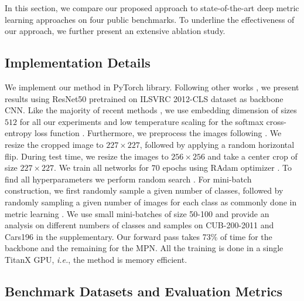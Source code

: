 \documentclass{article}
\begin{document}
In this section, we compare our proposed approach to state-of-the-art deep metric learning approaches on four public benchmarks. To underline the effectiveness of our approach, we further present an extensive ablation study.
\vspace{-0.3cm}
\subsection{Implementation Details}


We implement our method in PyTorch \cite{Paszke17} library. Following other works \cite{DBLP:conf/iccv/BrattoliRO19,DBLP:conf/cvpr/Cakir0XKS19,DBLP:conf/iccv/ManmathaWSK17,DDBLP:conf/cvpr/Sanakoyeu2019,DBLP:journals/corr/abs-2004-01113,DBLP:conf/wacv/XuanSP20,DBLP:journals/corr/abs-1811-12649}, we present results using ResNet50 \cite{7780459} pretrained on ILSVRC 2012-CLS dataset \cite{DBLP:journals/corr/RussakovskyDSKSMHKKBBF14} as backbone CNN. Like the majority of recent methods \cite{DBLP:conf/eccv/GeHDS18, DBLP:conf/cvpr/KimKCK20,DBLP:conf/cvpr/Park2019, DBLP:journals/corr/abs-1909-05235,DDBLP:conf/cvpr/Wand2019, DBLP:conf/cvpr/WangHKHGR19, DBLP:journals/corr/abs-2010-13636}, we use embedding dimension of sizes $512$ for all our experiments and low temperature scaling for the softmax cross-entropy loss function \cite{DBLP:conf/icml/GuoPSW17}. Furthermore, we preprocess the images following \cite{DBLP:conf/cvpr/KimKCK20}. We resize the cropped image to $227 \times 227$, followed by applying a random horizontal flip.
During test time, we resize the images to $256 \times 256$ and take a center crop of size $227 \times 227$. 
We train all networks for $70$ epochs using RAdam optimizer \cite{DBLP:journals/corr/abs-1908-03265}.
To find all hyperparameters we perform random search \cite{DBLP:journals/jmlr/BergstraB12}. For mini-batch construction, we first randomly sample a given number of classes, followed by randomly sampling a given number of images for each class as commonly done in metric learning \cite{DBLP:conf/eccv/GrLoss,DBLP:conf/cvpr/SchroffKP15,DBLP:journals/corr/abs-2004-01113, DBLP:journals/corr/abs-1811-12649}. We use small mini-batches of size 50-100 and provide an analysis on different numbers of classes and samples on CUB-200-2011 and Cars196 in the supplementary. Our forward pass takes 73\% of time for the backbone and the remaining for the MPN. All the training is done in a single TitanX GPU, \textit{i.e.}, the method is memory efficient.
\vspace{-0.3cm}
\subsection{Benchmark Datasets and Evaluation Metrics}
\end{document}
